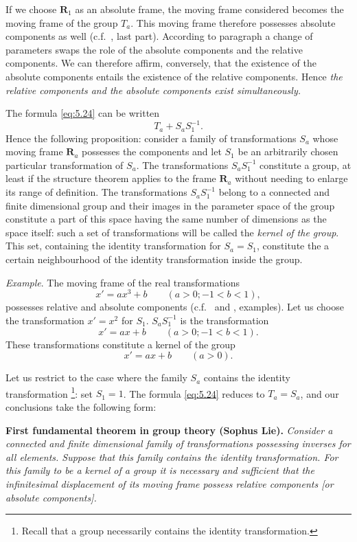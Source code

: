 If we choose $\mathbf{R}_{1}$ as an absolute frame, the moving frame considered becomes the moving frame of the group $T_{a}$. This moving frame therefore possesses absolute components as well (c.f.~, last part).  According to paragraph  a change of parameters swaps the role of the absolute components and the relative components. We can therefore affirm, conversely, that the existence of the absolute components entails the existence of the relative components. Hence \emph{the relative components and the absolute components exist simultaneously.}

The formula \eqref{eq:5.24} can be written
\[
T_{a}+S_{a}S_{1}^{-1}.
\]
Hence the following proposition: consider a family of transformations $S_{a}$ whose moving frame $\mathbf{R}_{a}$ possesses the components and let $S_{1}$ be an arbitrarily chosen particular transformation of $S_{a}$. The transformations $S_{a}S_{1}^{-1}$ constitute a group, at least if the structure theorem applies to the frame $\mathbf{R}_{a}$ without needing to enlarge its range of definition. The transformations $S_{a}S_{1}^{-1}$ belong to a connected and finite dimensional group and their images in the parameter space of the group constitute a part of this space having the same number of dimensions as the space itself: such a set of transformations will be called the \emph{kernel of the group}. This set, containing the identity transformation for $S_{a}=S_{1}$, constitute the a certain neighbourhood of the identity transformation inside the group.

\somespace

{\small
\emph{Example}. The moving frame of the real transformations
\[
x'=ax^{3}+b\qquad(a>0;-1<b<1),
\]
possesses relative and absolute components (c.f.~ and , examples). Let us choose the transformation $x'=x^{2}$ for $S_{1}$. $S_{a}S_{1}^{-1}$ is the transformation
\[
x'=ax+b\qquad(a>0;-1<b<1).
\]
These transformations constitute a kernel of the group
\[
x'=ax+b\qquad(a>0).
\]
}

Let us restrict to the case where the family $S_{a}$ contains the identity transformation \footnote{Recall that a group necessarily contains the identity transformation.}: set $S_{1}=1$. The formula \eqref{eq:5.24} reduces to $T_{a}=S_{a}$, and our conclusions take the following form:

\somespace

\textbf{First fundamental theorem in group theory (Sophus Lie).} \emph{Consider a connected and finite dimensional family of transformations possessing inverses for all elements. Suppose that this family contains the identity transformation. For this family to be a kernel of a group it is necessary and sufficient that the infinitesimal displacement of its moving frame possess relative components [or absolute components].}

